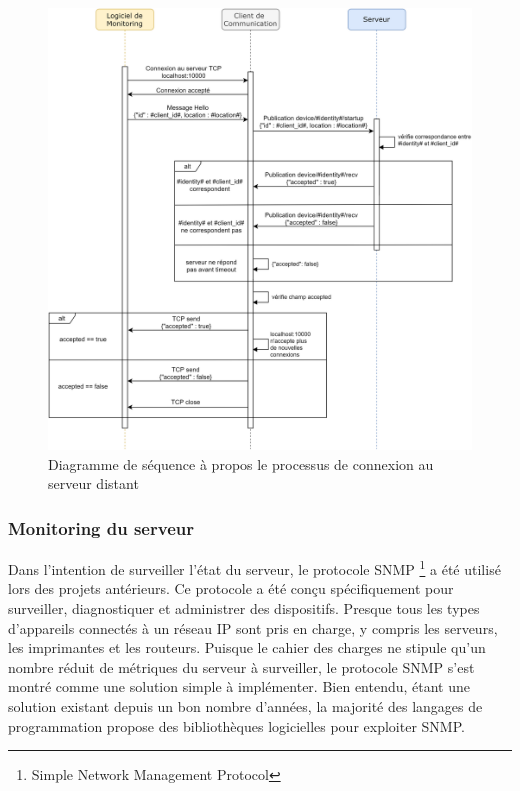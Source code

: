 \begin{figure}[ht!]
  \includegraphics[width=\textwidth]{img/app/con_protocol.png}
  \caption{Diagramme de séquence à propos le processus de connexion au serveur distant}
  \label{fig:seq111}
\end{figure}

\newpage
\newpage


\subsubsection{Monitoring du serveur}

\noindent
Dans l’intention de surveiller l’état du serveur, le protocole SNMP \footnote{Simple Network Management Protocol} a été utilisé lors des projets antérieurs. Ce protocole a été conçu spécifiquement pour surveiller, diagnostiquer et administrer des dispositifs. Presque tous les types d'appareils connectés à un réseau IP sont pris en charge, y compris les serveurs, les imprimantes et les routeurs. Puisque le cahier des charges ne stipule qu’un nombre réduit de métriques du serveur à surveiller, le protocole SNMP s’est montré comme une solution simple à implémenter. Bien entendu, étant une solution existant depuis un bon nombre d’années, la majorité des langages de programmation propose des bibliothèques logicielles pour exploiter SNMP.


